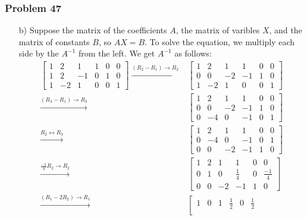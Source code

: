 \documentclass[a4paper,12pt]{article}
\begin{document}
\subsubsection*{Problem 47}
\begin{itemize}
    \item [b)] Suppose the matrix of the coefficients $A$, the matrix of varibles $X$, and the matrix of constants $B$, so $AX=B$. To solve the equation, we multiply each side by the $A^{-1}$ from the left. We get $A^{-1}$ as follows:
    \begin{align*}
        \left [\begin{array}{ccc|ccc}
            1&2&1&1&0&0\\
            1&2&-1&0&1&0\\
            1&-2&1&0&0&1
        \end{array} \right ] \xrightarrow{{(R_2-R_1)}\to{R_2}}
        &\left [\begin{array}{ccc|ccc}
            1&2&1&1&0&0\\
            0&0&-2&-1&1&0\\
            1&-2&1&0&0&1
        \end{array} \right ]\\ \xrightarrow{{(R_3-R_1)}\to{R_3}}
        &\left [\begin{array}{ccc|ccc}
            1&2&1&1&0&0\\
            0&0&-2&-1&1&0\\
            0&-4&0&-1&0&1
        \end{array} \right ]\\ \xrightarrow{{R_2}\leftrightarrow{R_3}}
         &\left [\begin{array}{ccc|ccc}
            1&2&1&1&0&0\\
            0&-4&0&-1&0&1\\
            0&0&-2&-1&1&0
        \end{array} \right ]\\ \xrightarrow{{\frac{-1}{4}R_2}\to{R_2}}
        &\left [\begin{array}{ccc|ccc}
            1&2&1&1&0&0\\
            0&1&0&\frac{1}{4}&0&\frac{-1}{4}\\
            0&0&-2&-1&1&0
        \end{array} \right ]\\ \xrightarrow{{(R_1-2R_2)}\to{R_1}}
        &\left [\begin{array}{ccc|ccc}
            1&0&1&\frac{1}{2}&0&\frac{1}{2}\\

\end{array}
\end{align*}
\end{itemize}
\end{document}
